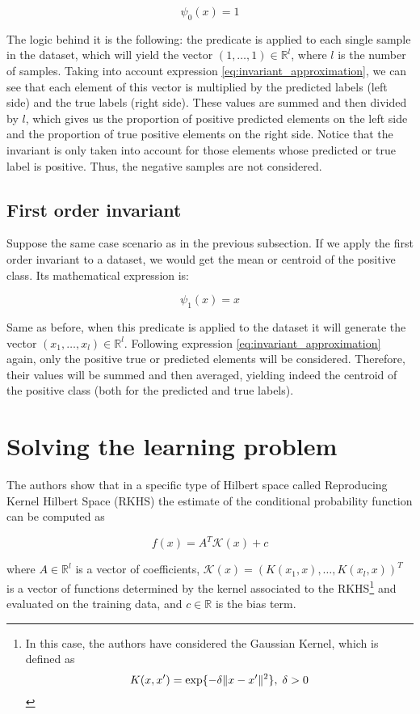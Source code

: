\[
    \psi_0(x) = 1
\]

The logic behind it is the following: the predicate is applied to each single sample in the dataset,
which will yield the vector $(1, \dots, 1) \in \mathbb{R}^l $, where $l$ is the number of samples. Taking into account
expression \eqref{eq:invariant_approximation}, we can see that each element of this vector is multiplied
by the predicted labels (left side) and the true labels (right side). These values are summed and then divided
by $l$, which gives us the proportion of positive predicted elements on the left side and the proportion
of true positive elements on the right side. Notice that the invariant is only taken into account for those
elements whose predicted or true label is positive. Thus, the negative samples are not considered.

\subsection{First order invariant}

Suppose the same case scenario as in the previous subsection. If we apply the first order invariant to
a dataset, we would get the mean or centroid of the positive class. Its mathematical expression is:

\[
    \psi_1(x) = x
\]

Same as before, when this predicate is applied to the dataset it will generate the vector
$(x_1, \dots, x_l) \in \mathbb{R}^l$. Following expression \eqref{eq:invariant_approximation} again,
only the positive true or predicted elements will be considered. Therefore, their values will be summed and
then averaged, yielding indeed the centroid of the positive class (both for the predicted and true labels).

\section{Solving the learning problem}
\label{sect:solvin_learning_problem}

The authors show that in a specific type of Hilbert space called Reproducing Kernel Hilbert Space (RKHS)
the estimate of the conditional probability function can be computed as

\[
    f(x) = A^T \mathcal{K}(x) + c
\]

where $A \in \mathbb{R}^l$ is a vector of coefficients, $\mathcal{K}(x) = (K(x_1, x), \dots, K(x_l, x))^T$
is a vector of functions determined by the kernel associated to the RKHS\footnote{In this case, the authors have
considered the Gaussian Kernel, which is defined as
\[
    K(x, x') = \exp \lbrace -\delta \lVert x - x' \rVert^2 \rbrace,\; \delta > 0
\]
}
and evaluated on the training data, and $c \in \mathbb{R}$ is the bias term.

